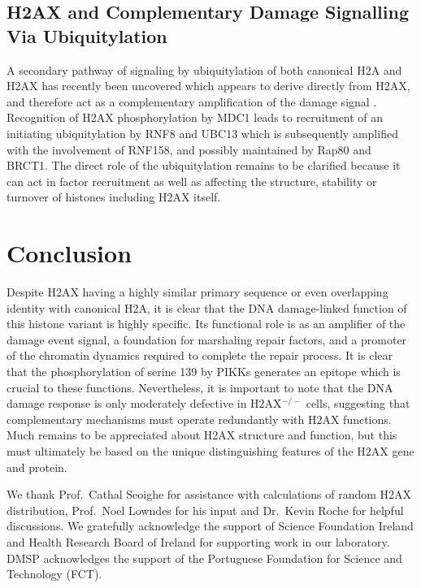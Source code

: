 \documentclass[graybox]{svmult}
\begin{document}
\subsection{\ugamma H2AX and Complementary Damage Signalling Via Ubiquitylation}
\label{subsec:H2AX-ubi}
A secondary pathway of signaling by ubiquitylation of both canonical H2A and H2AX has recently been
uncovered which appears to derive directly from \ugamma H2AX, and therefore act as a complementary
amplification of the damage signal \cite{PD09}. Recognition of H2AX phosphorylation by MDC1 leads to
recruitment of an initiating ubiquitylation by RNF8 and UBC13 which is subsequently amplified with
the involvement of RNF158, and possibly maintained by Rap80 and BRCT1\@. The direct role of the
ubiquitylation remains to be clarified because it can act in factor recruitment as well as affecting
the structure, stability or turnover of histones including H2AX itself.

\section{Conclusion}
\label{sec:conclusion}
Despite H2AX having a highly similar primary sequence or even overlapping identity with canonical H2A,
it is clear that the DNA damage-linked function of this histone variant is highly specific. Its
functional role is as an amplifier of the damage event signal, a foundation for marshaling repair
factors, and a promoter of the chromatin dynamics required to complete the repair process. It is
clear that the phosphorylation of serine 139 by PIKKs generates an epitope which is crucial to these
functions. Nevertheless, it is important to note that the DNA damage response is only moderately
defective in H2AX$^{-/-}$ cells, suggesting that complementary mechanisms must operate redundantly
with H2AX functions. Much remains to be appreciated about \ugamma H2AX structure and function, but
this must ultimately be based on the unique distinguishing features of the H2AX gene and protein.

\begin{acknowledgement}
We thank Prof.\ Cathal Seoighe for assistance with calculations of random H2AX distribution,
Prof.\ Noel Lowndes for his input and Dr.\ Kevin Roche for helpful discussions. We gratefully
acknowledge the support of Science Foundation Ireland and Health Research Board of Ireland for
supporting work in our laboratory. DMSP acknowledges the support of the Portuguese Foundation for
Science and Technology (FCT).
\end{acknowledgement}
\end{document}
